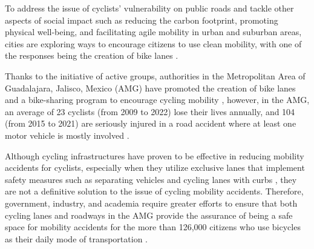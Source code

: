 \documentclass[preprint,12pt]{elsarticle}
\begin{document}
To address the issue of cyclists' vulnerability on public roads and tackle other aspects of social impact such as reducing the carbon footprint, promoting physical well-being, and facilitating agile mobility in urban and suburban areas, cities are exploring ways to encourage citizens to use clean mobility, with one of the responses being the creation of bike lanes \cite{mertens_built_2017}.

Thanks to the initiative of active groups, authorities in the Metropolitan Area of Guadalajara, Jalisco, Mexico (AMG) have promoted the creation of bike lanes and a bike-sharing program to encourage cycling mobility \cite{vega_mas_2020}\cite{jalisco_anuncia_nodate}, however, in the AMG, an average of 23 cyclists (from 2009 to 2022) lose their lives annually, and 104 (from 2015 to 2021) are seriously injured in a road accident where at least one motor vehicle is mostly involved \cite{noauthor_datos_nodate}\cite{iieg_mapa_nodate}.

Although cycling infrastructures have proven to be effective in reducing mobility accidents for cyclists, especially when they utilize exclusive lanes that implement safety measures such as separating vehicles and cycling lanes with curbs \cite{mertens_built_2017}, they are not a definitive solution to the issue of cycling mobility accidents. Therefore, government, industry, and academia require greater efforts to ensure that both cycling lanes and roadways in the AMG provide the assurance of being a safe space for mobility accidents for the more than 126,000 citizens who use bicycles as their daily mode of transportation \cite{jalisco_como_vamos_septima_2020}\cite{iieg_cuadernillos_2020}.
\end{document}
